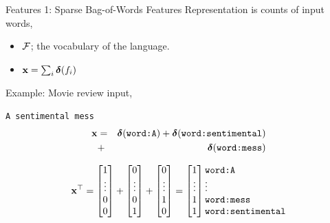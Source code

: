\documentclass{beamer}
\begin{document}
\begin{frame}{Features 1: Sparse Bag-of-Words Features}
  Representation is counts of input words, 
  \begin{itemize}
  \item $\mathcal{F}$; the vocabulary of the language.
  \item $\mathbf{x} = \sum_{i} \boldsymbol{\delta}(f_i)$ 
  \end{itemize}

  Example: Movie review input, 
  \begin{center}
    \texttt{A sentimental mess}
    \begin{eqnarray*}
      \mathbf{x} &=& \boldsymbol{\delta}(\texttt{word:A}) + \boldsymbol{\delta}(\texttt{word:sentimental}) \\ 
    &+& \boldsymbol{\delta}(\texttt{word:mess})
    \end{eqnarray*}

    \[ \boldx^\top =\begin{bmatrix} 1 \\ \vdots
        \\ 0\\ 0 \\ \end{bmatrix} +\begin{bmatrix} 0 \\
        \vdots \\ 0\\ 1 \\ \end{bmatrix} +
     \begin{bmatrix} 0 \\ \vdots \\ 1\\ 0 \\ \end{bmatrix} 
    =\begin{bmatrix} 1 \\ \vdots \\ 1 \\ 1 \\ \end{bmatrix} 
    \begin{matrix*}[l] \mathrm{\texttt{word:A}} \\ \vdots \\ \mathrm{\texttt{word:mess}} \\ \mathrm{\texttt{word:sentimental}} \\ \end{matrix*}
     \]
  \end{center}
\end{frame}
\end{document}
